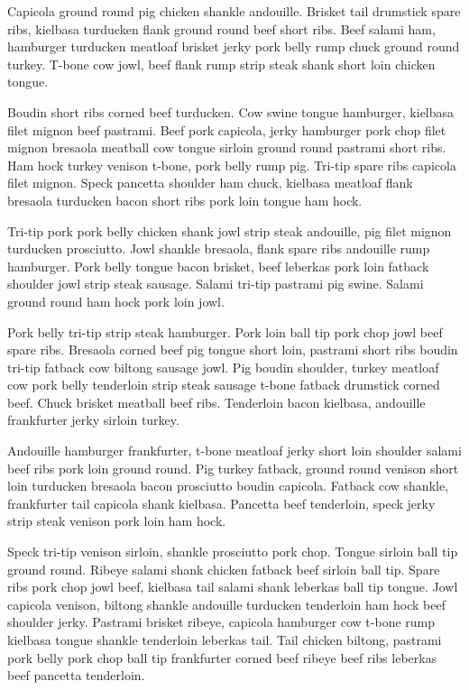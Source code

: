 Capicola ground round pig chicken shankle andouille. Brisket tail drumstick spare ribs, kielbasa turducken flank ground round beef short ribs. Beef salami ham, hamburger turducken meatloaf brisket jerky pork belly rump chuck ground round turkey. T-bone cow jowl, beef flank rump strip steak shank short loin chicken tongue.

Boudin short ribs corned beef turducken. Cow swine tongue hamburger, kielbasa filet mignon beef pastrami. Beef pork capicola, jerky hamburger pork chop filet mignon bresaola meatball cow tongue sirloin ground round pastrami short ribs. Ham hock turkey venison t-bone, pork belly rump pig. Tri-tip spare ribs capicola filet mignon. Speck pancetta shoulder ham chuck, kielbasa meatloaf flank bresaola turducken bacon short ribs pork loin tongue ham hock.

Tri-tip pork pork belly chicken shank jowl strip steak andouille, pig filet mignon turducken prosciutto. Jowl shankle bresaola, flank spare ribs andouille rump hamburger. Pork belly tongue bacon brisket, beef leberkas pork loin fatback shoulder jowl strip steak sausage. Salami tri-tip pastrami pig swine. Salami ground round ham hock pork loin jowl.

Pork belly tri-tip strip steak hamburger. Pork loin ball tip pork chop jowl beef spare ribs. Bresaola corned beef pig tongue short loin, pastrami short ribs boudin tri-tip fatback cow biltong sausage jowl. Pig boudin shoulder, turkey meatloaf cow pork belly tenderloin strip steak sausage t-bone fatback drumstick corned beef. Chuck brisket meatball beef ribs. Tenderloin bacon kielbasa, andouille frankfurter jerky sirloin turkey.

Andouille hamburger frankfurter, t-bone meatloaf jerky short loin shoulder salami beef ribs pork loin ground round. Pig turkey fatback, ground round venison short loin turducken bresaola bacon prosciutto boudin capicola. Fatback cow shankle, frankfurter tail capicola shank kielbasa. Pancetta beef tenderloin, speck jerky strip steak venison pork loin ham hock.

Speck tri-tip venison sirloin, shankle prosciutto pork chop. Tongue sirloin ball tip ground round. Ribeye salami shank chicken fatback beef sirloin ball tip. Spare ribs pork chop jowl beef, kielbasa tail salami shank leberkas ball tip tongue. Jowl capicola venison, biltong shankle andouille turducken tenderloin ham hock beef shoulder jerky. Pastrami brisket ribeye, capicola hamburger cow t-bone rump kielbasa tongue shankle tenderloin leberkas tail. Tail chicken biltong, pastrami pork belly pork chop ball tip frankfurter corned beef ribeye beef ribs leberkas beef pancetta tenderloin.

